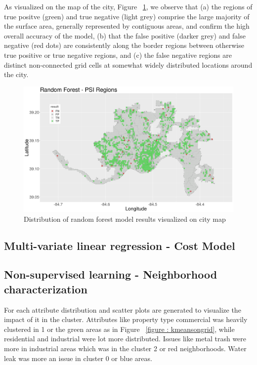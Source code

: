 \documentclass{llncs}
\begin{document}
As visualized on the map of the city, Figure ~\ref{figure : rfbinarymap}, we observe that (a) the regions of true positve (green) and true negative (light grey) comprise the large majority of the surface area, generally represented by contiguous areas, and confirm the high overall accuracy of the model, (b) that the false positive (darker grey) and false negative (red dots) are consistently along the border regions between otherwise true positive or true negative regions, and (c)  the false negative regions are distinct non-connected grid cells at somewhat widely distributed locations around the city.
\newline

\FloatBarrier
\begin{figure}
 	\includegraphics[width=\textwidth, height=\textheight, keepaspectratio]{RFBinaryResultsMap.png}
 	\caption{Distribution of random forest model results visualized on city map}
	\label{figure : rfbinarymap}
\end{figure}
\FloatBarrier

\subsection{Multi-variate linear regression - Cost Model}

\subsection{Non-supervised learning - Neighborhood characterization}

For each attribute distribution and scatter plots are generated to visualize the impact of it in the cluster. Attributes like property type commercial was heavily clustered in 1 or the green areas as in Figure ~\ref{figure : kmeansongrid}, while residential and industrial were lot more distributed. Issues like metal trash were more in industrial areas which was in the cluster 2 or red neighborhoods. Water leak was more an issue in cluster 0 or blue areas.
\end{document}
